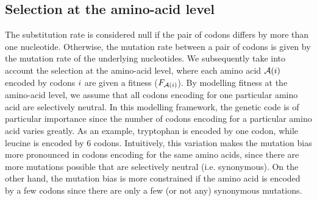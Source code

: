 \subsection{Selection at the amino-acid level}
\label{sec:mut-bias-aa-selection}
The substitution rate is considered null if the pair of codons differs by more than one nucleotide.
Otherwise, the mutation rate between a pair of codons is given by the mutation rate of the underlying nucleotides.
We subsequently take into account the selection at the amino-acid level, where each amino acid $\mathcal{A}({i})$ encoded by codons ${i}$ are given a fitness ($F_{\mathcal{A}({i})}$).
By modelling fitness at the amino-acid level, we assume that all codons encoding for one particular amino acid are selectively neutral.
In this modelling framework, the genetic code is of particular importance since the number of codons encoding for a particular amino acid varies greatly.
As an example, tryptophan is encoded by one codon, while leucine is encoded by 6 codons.
Intuitively, this variation makes the mutation bias more pronounced in codons encoding for the same amino acids, since there are more mutations possible that are selectively neutral (i.e. synonymous).
On the other hand, the mutation bias is more constrained if the amino acid is encoded by a few codons since there are only a few (or not any) synonymous mutations.

